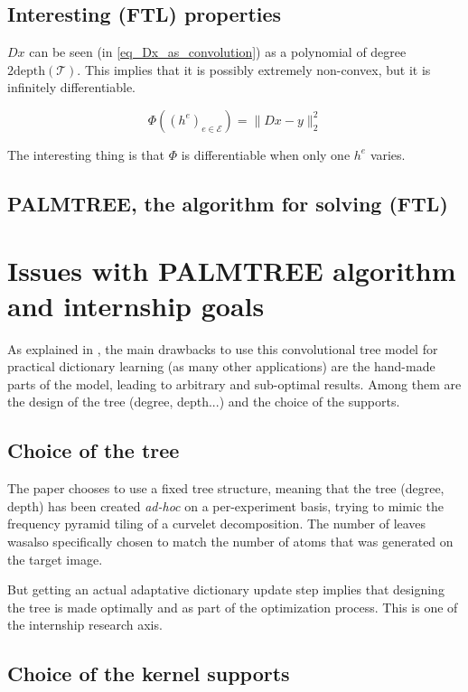 \subsection{Interesting (FTL) properties}
$Dx$ can be seen (in \cref{eq_Dx_as_convolution}) as a polynomial of degree $2\text{depth}(\mathcal{T})$. This implies that it is possibly extremely non-convex, but it is infinitely differentiable.

$$\Phi((h^e)_{e \in \mathcal{E}}) = \lVert Dx-y \rVert^2_2$$

The interesting thing is that $\Phi$ is differentiable when only one $h^e$ varies. %


\subsection{PALMTREE, the algorithm for solving (FTL)}

\section{Issues with PALMTREE algorithm and internship goals}
As explained in \cite[p. 23]{chabiron_optimization_2016}, the main drawbacks to use this convolutional tree model for practical dictionary learning (as many other applications) are the hand-made parts of the model, leading to arbitrary and sub-optimal results. Among them are the design of the tree (degree, depth...) and the choice of the supports. %
\subsection{Choice of the tree}
The paper chooses to use a fixed tree structure, meaning that the tree (degree, depth) has been created \emph{ad-hoc} on a per-experiment basis, trying to mimic the frequency pyramid tiling of a curvelet decomposition. The number of leaves wasalso specifically chosen to match the number of atoms that was generated on the target image.

But getting an actual adaptative dictionary update step implies that designing the tree is made optimally and as part of the optimization process. This is one of the internship research axis.

\subsection{Choice of the kernel supports}


